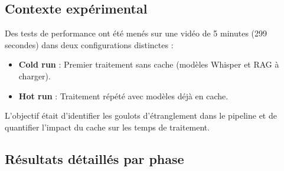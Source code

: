 ﻿\documentclass[12pt,a4paper]{article}
\begin{document}
\subsection{Contexte expérimental}
Des tests de performance ont été menés sur une vidéo de 5 minutes (299 secondes) dans deux configurations distinctes :
\begin{itemize}
    \item \textbf{Cold run} : Premier traitement sans cache (modèles Whisper et RAG à charger).
    \item \textbf{Hot run} : Traitement répété avec modèles déjà en cache.
\end{itemize}

L'objectif était d'identifier les goulots d'étranglement dans le pipeline et de quantifier l'impact du cache sur les temps de traitement.

\subsection{Résultats détaillés par phase}
\end{document}
